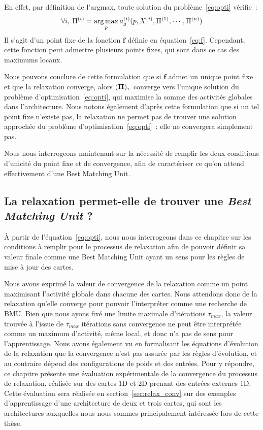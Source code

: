 \documentclass[../main]{subfiles}
\begin{document}
En effet, par définition de l'argmax, toute solution du problème~\ref{eq:opti} vérifie~:
$$\forall i, \: \Pi^{({i})} = \operatorname*{arg\,max}\limits_p a_g^{({i})}(p, X^{({i})}, \Pi^{({1})}, \cdots, \Pi^{({n})})$$
Il s'agit d'un point fixe de la fonction $\mathbf{f}$ définie en équation~\ref{eq:f}.
Cependant, cette fonction peut admettre plusieurs points fixes, qui sont dans ce cas des maximums locaux. 

Nous pouvons conclure de cette formulation que si $\mathbf{f}$ admet un unique point fixe et que la relaxation converge, alors $(\mathbf{\Pi})_\tau$ converge vers l'unique solution du problème d'optimisation~\ref{eq:opti}, qui maximise la somme des activités globales dans l'architecture.
Nous notons également d'après cette formulation que si un tel point fixe n'existe pas, la relaxation ne permet pas de trouver une solution approchée du problème d'optimisation~\ref{eq:opti}~: elle ne convergera simplement pas.

Nous nous interrogeons maintenant sur la nécessité de remplir les deux conditions d'unicité du point fixe et de convergence, afin de caractériser ce qu'on attend effectivement d'une Best Matching Unit.

\subsection{La relaxation permet-elle de trouver une \emph{Best Matching Unit} ?}

\`A partir de l'équation~\ref{eq:opti}, nous nous interrogeons dans ce chapitre sur les conditions à remplir pour le processus de relaxation afin de pouvoir définir sa valeur finale comme une \og Best Matching Unit \fg{} ayant un sens pour les règles de mise à jour des cartes.

Nous avons exprimé la valeur de convergence de la relaxation comme un point maximisant l'activité globale dans chacune des cartes. Nous attendons donc de la relaxation qu'elle converge pour pouvoir l'interpréter comme une recherche de BMU. 
Bien que nous ayons fixé une limite maximale d'itérations $\tau_{max}$, la valeur trouvée à l'issue de $\tau_{max}$ itérations sans convergence ne peut être interprétée comme un maximum d'activité, même local, et donc n'a pas de sens pour l'apprentissage. Nous avons également vu en formalisant les équations d'évolution de la relaxation que la convergence n'est pas assurée par les règles d'évolution, et au contraire dépend des configurations de poids et des entrées.
Pour y répondre, ce chapitre présente une évaluation expérimentale de la convergence du processus de relaxation, réalisée sur des cartes 1D et 2D prenant des entrées externes 1D.
Cette évaluation  sera réalisée en section~\ref{sec:relax_conv} sur des exemples d'apprentissage d'une architecture de deux et trois cartes, qui sont les architectures auxquelles nous nous sommes principalement intéressée lors de cette thèse.
\end{document}
